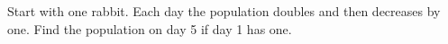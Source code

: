 Start with one rabbit. Each day the population doubles and then decreases by one. Find the population on day 5 if day 1 has one.
